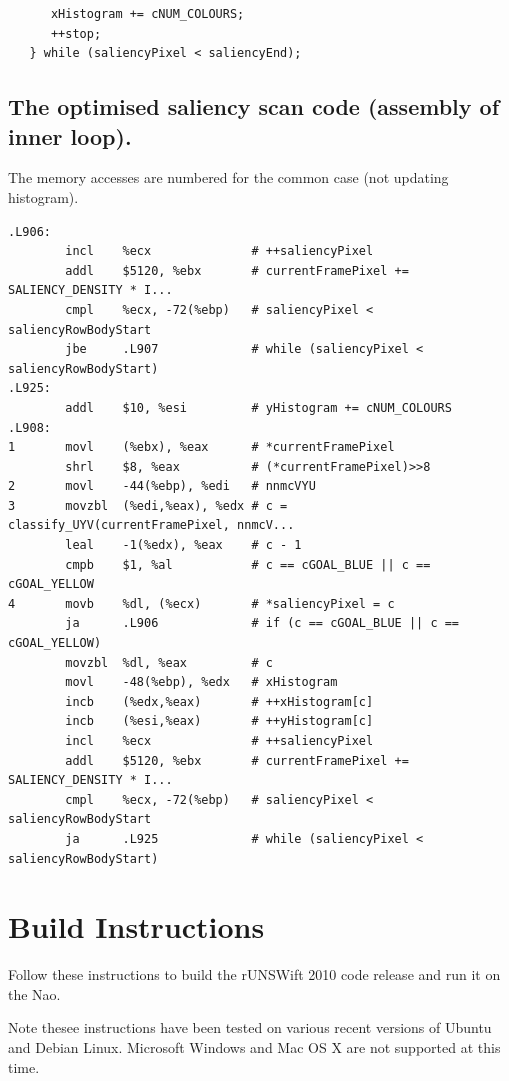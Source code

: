 \documentclass[pdftex,11pt,a4paper]{report}
\begin{document}
\begin{notesfornextyear}
\begin{lstlisting}
      xHistogram += cNUM_COLOURS;
      ++stop;
   } while (saliencyPixel < saliencyEnd);
\end{lstlisting}
\section{The optimised saliency scan code (assembly of inner loop).}
The memory accesses are numbered for the common case (not updating histogram).
\lstset{language=[x86masm]Assembler}
\begin{lstlisting}
.L906:
        incl    %ecx              # ++saliencyPixel
        addl    $5120, %ebx       # currentFramePixel += SALIENCY_DENSITY * I...
        cmpl    %ecx, -72(%ebp)   # saliencyPixel < saliencyRowBodyStart
        jbe     .L907             # while (saliencyPixel < saliencyRowBodyStart)
.L925:
        addl    $10, %esi         # yHistogram += cNUM_COLOURS
.L908:
1       movl    (%ebx), %eax      # *currentFramePixel
        shrl    $8, %eax          # (*currentFramePixel)>>8
2       movl    -44(%ebp), %edi   # nnmcVYU
3       movzbl  (%edi,%eax), %edx # c = classify_UYV(currentFramePixel, nnmcV...
        leal    -1(%edx), %eax    # c - 1
        cmpb    $1, %al           # c == cGOAL_BLUE || c == cGOAL_YELLOW
4       movb    %dl, (%ecx)       # *saliencyPixel = c
        ja      .L906             # if (c == cGOAL_BLUE || c == cGOAL_YELLOW)
        movzbl  %dl, %eax         # c
        movl    -48(%ebp), %edx   # xHistogram
        incb    (%edx,%eax)       # ++xHistogram[c]
        incb    (%esi,%eax)       # ++yHistogram[c]
        incl    %ecx              # ++saliencyPixel
        addl    $5120, %ebx       # currentFramePixel += SALIENCY_DENSITY * I...
        cmpl    %ecx, -72(%ebp)   # saliencyPixel < saliencyRowBodyStart
        ja      .L925             # while (saliencyPixel < saliencyRowBodyStart)
\end{lstlisting}
\end{notesfornextyear}

\chapter{Build Instructions}

Follow these instructions to build the rUNSWift 2010 code release and run it on the Nao.

Note thesee instructions have been tested on various recent versions of Ubuntu and Debian Linux. Microsoft Windows and Mac OS X are not supported at this time.
\end{document}
